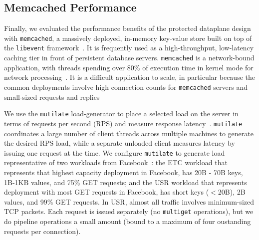 
\subsection{Memcached Performance}
\label{sec:eval:memcached}




Finally, we evaluated the performance benefits of the \ix protected
dataplane design with \texttt{memcached}, a massively deployed,
in-memory key-value store built on top of the \texttt{libevent}
framework~\cite{url:memcached}. It is frequently used as a
high-throughput, low-latency caching tier in front of persistent
database servers. \texttt{memcached} is a network-bound application,
with threads spending over 80\% of execution time in kernel mode for
network processing~\cite{DBLP:conf/eurosys/LeverichK14}. It is a difficult
application to scale, in particular because the common deployments
involve high connection counts for \texttt{memcached} servers and
small-sized requests and
replies~\cite{DBLP:conf/nsdi/NishtalaFGKLLMPPSSTV13,Atikoglu:2012:WAL}

We use the \texttt{mutilate} load-generator to place a selected load
on the server in terms of requests per second (RPS) and measure
response latency~\cite{url:mutilate}. \texttt{mutilate} coordinates a
large number of client threads across multiple machines to generate
the desired RPS load, while a separate unloaded client measures
latency by issuing one request at the time.  We configure
\texttt{mutilate} to generate load representative of two workloads
from Facebook~\cite{Atikoglu:2012:WAL}: the ETC workload that
represents that highest capacity deployment in Facebook, has 20B - 70B
keys, 1B-1KB values, and 75\% GET requests; and the USR workload that
represents deployment with most GET requests in Facebook, has short
keys ($<$20B), 2B values, and 99\% GET requests. In USR, almost all
traffic involves minimum-sized TCP packets. Each request is issued
separately (no \texttt{multiget} operations),  but we do pipeline
operations a small amount (bound to a maximum of four oustanding
requests per connection).


